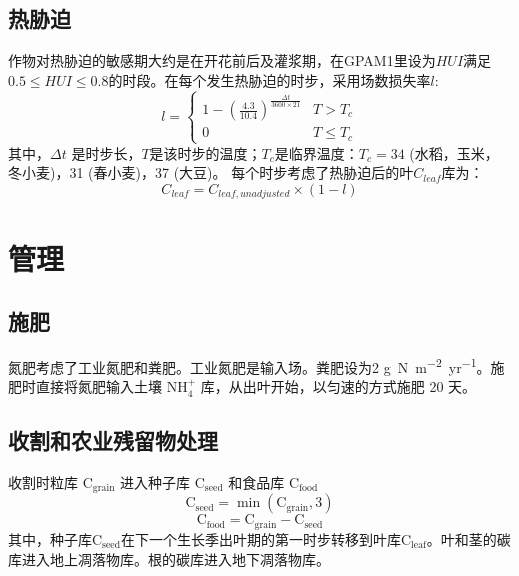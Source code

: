 \subsection{热胁迫}
作物对热胁迫的敏感期大约是在开花前后及灌浆期，在GPAM1里设为$HUI $满足$0.5 \leqslant HUI \leqslant 0.8$的时段。在每个发生热胁迫的时步，采用场数损失率$l$:
\begin{equation}
l=\left\{\begin{array}{cc}1-\left(\frac{4.3}{10.4}\right)^{\frac{\Delta t}{3600\times 21}} & T>T_{c} \\ 0 & T \leqslant T_{c}\end{array}\right.
\end{equation}
其中，$\Delta t$ 是时步长，$T$是该时步的温度；$T_c$是临界温度：$T_c=34$ \textcelsius (水稻，玉米，冬小麦)，31 \textcelsius (春小麦)，37 \textcelsius (大豆)。
每个时步考虑了热胁迫后的叶$C_{leaf}$库为：
\begin{equation}
C_{leaf}=C_{leaf,  {unadjusted}} \times (1-l)
\end{equation}


\section{管理}
\subsection{施肥}
氮肥考虑了工业氮肥和粪肥。工业氮肥是输入场。粪肥设为2 \unit{g.N.m^{−2}.yr^{−1}}。施肥时直接将氮肥输入土壤 $\mathrm{NH_4^+}$ 库，从出叶开始，以匀速的方式施肥 20 天。

\subsection{收割和农业残留物处理}
收割时粒库 $\mathrm{C_{grain}}$ 进入种子库 $\mathrm{C_{seed}}$ 和食品库 $\mathrm{C_{food}}$
\begin{equation}
\mathrm{{C}_{seed}}=\min \left(\mathrm{C_{grain}}, 3\right)
\end{equation}
\begin{equation}
\mathrm{C_{food}}=\mathrm{C_{grain}}-\mathrm{C_{seed}}
\end{equation}
其中，种子库$\mathrm{C_{seed}}$在下一个生长季出叶期的第一时步转移到叶库$\mathrm{C_{leaf}}$。叶和茎的碳库进入地上凋落物库。根的碳库进入地下凋落物库。

